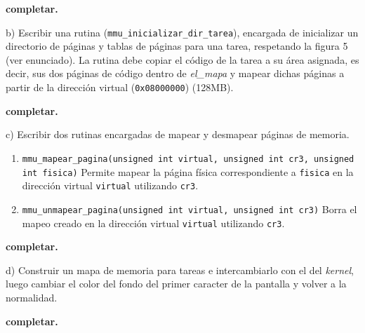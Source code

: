 \vspace*{0.3cm}

\textbf{completar.}

\vspace*{0.5cm} \noindent



\noindent
b) Escribir una rutina (\verb|mmu_inicializar_dir_tarea|), encargada de inicializar un directorio de páginas y tablas de páginas para una tarea, respetando la figura 5 (ver enunciado). La rutina debe copiar el código de la tarea a su área asignada, es decir, sus dos páginas de código dentro de \textit{el_mapa} y mapear dichas páginas a partir de la dirección virtual (\verb|0x08000000|) (128MB).

\vspace*{0.3cm}

\textbf{completar.}

\vspace*{0.5cm} \noindent



\noindent
c) Escribir dos rutinas encargadas de mapear y desmapear páginas de memoria.

\begin{enumerate}
  \item \verb|mmu_mapear_pagina(unsigned int virtual, unsigned int cr3, unsigned int fisica)| \newline
  Permite mapear la página física correspondiente a \verb|fisica| en la dirección virtual \verb|virtual| utilizando \verb|cr3|.
  
  \item \verb|mmu_unmapear_pagina(unsigned int virtual, unsigned int cr3)| \newline
  Borra el mapeo creado en la dirección virtual \verb|virtual| utilizando \verb|cr3|.
\end{enumerate}

\vspace*{0.3cm}

\textbf{completar.}

\vspace*{0.5cm} \noindent



\noindent
d) Construir un mapa de memoria para tareas e intercambiarlo con el del \textit{kernel}, luego cambiar el color del fondo del primer caracter de la pantalla y volver a la normalidad.

\vspace*{0.3cm}

\textbf{completar.}

